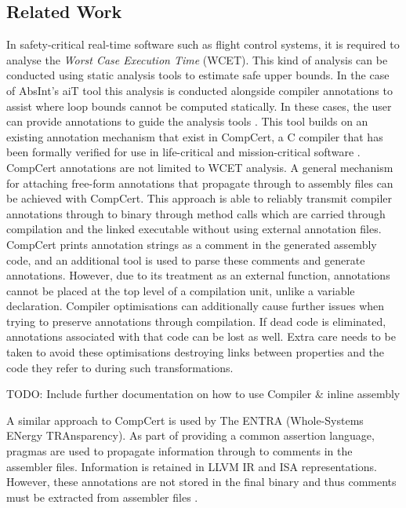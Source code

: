 \subsection{Related Work}
In safety-critical real-time software such as flight control systems, it is required to analyse the \textit{Worst Case Execution Time} (WCET). This kind of analysis can be conducted using static analysis tools to estimate safe upper bounds. In the case of AbsInt's aiT tool this analysis is conducted alongside compiler annotations to assist where loop bounds cannot be computed statically. In these cases, the user can provide annotations to guide the analysis tools \cite{schommer2018embedded}. This tool builds on an existing annotation mechanism that exist in CompCert, a C compiler that has been formally verified for use in life-critical and mission-critical software \cite{compcert}\cite{leroy2016compcert}. CompCert annotations are not limited to WCET analysis. A general mechanism for attaching free-form annotations that propagate through to assembly files can be achieved with CompCert. This approach is able to reliably transmit compiler annotations through to binary through method calls which are carried through compilation and the linked executable without using external annotation files. CompCert prints annotation strings as a comment in the generated assembly code, and an additional tool is used to parse these comments and generate annotations. However, due to its treatment as an external function, annotations cannot be placed at the top level of a compilation unit, unlike a variable declaration. Compiler optimisations can additionally cause further issues when trying to preserve annotations through compilation. If dead code is eliminated, annotations associated with that code can be lost as well. Extra care needs to be taken to avoid these optimisations destroying links between properties and the code they refer to during such transformations.

\label{sec:compCert}
TODO: Include further documentation on how to use Compiler \& inline assembly

A similar approach to CompCert is used by The ENTRA (Whole-Systems ENergy TRAnsparency). As part of providing a common assertion language, pragmas are used to propagate information through to comments in the assembler files. Information is retained in LLVM IR and ISA representations. However, these annotations are not stored in the final binary and thus comments must be extracted from assembler files \cite{eder2013common}.

